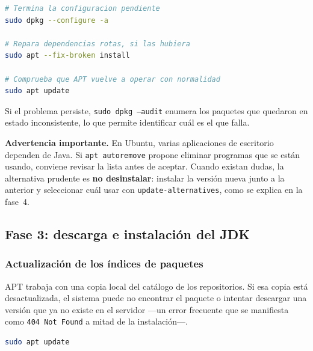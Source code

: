 \begin{lstlisting}[language=bash,caption={Reparación del estado de dpkg},morekeywords={sudo,dpkg,configure,apt,fix-broken,install,update,audit}]
# Termina la configuracion pendiente
sudo dpkg --configure -a

# Repara dependencias rotas, si las hubiera
sudo apt --fix-broken install

# Comprueba que APT vuelve a operar con normalidad
sudo apt update
\end{lstlisting}

Si el problema persiste, \texttt{sudo dpkg --audit} enumera los paquetes que quedaron
en estado inconsistente, lo que permite identificar cuál es el que falla.


\textbf{Advertencia importante.} En Ubuntu, varias aplicaciones de escritorio dependen
de Java. Si \texttt{apt autoremove} propone eliminar programas que se están usando,
conviene revisar la lista antes de aceptar. Cuando existan dudas, la alternativa
prudente es \textbf{no desinstalar}: instalar la versión nueva junto a la anterior y
seleccionar cuál usar con \texttt{update-alternatives}, como se explica en la fase~4.

\subsection{Fase 3: descarga e instalación del JDK}

\subsubsection{Actualización de los índices de paquetes}

APT trabaja con una copia local del catálogo de los repositorios. Si esa copia está
desactualizada, el sistema puede no encontrar el paquete o intentar descargar una
versión que ya no existe en el servidor —un error frecuente que se manifiesta como
\texttt{404 Not Found} a mitad de la instalación—.

\begin{lstlisting}[language=bash,caption={Actualización del catálogo de paquetes},morekeywords={sudo,apt,update}]
sudo apt update
\end{lstlisting}

